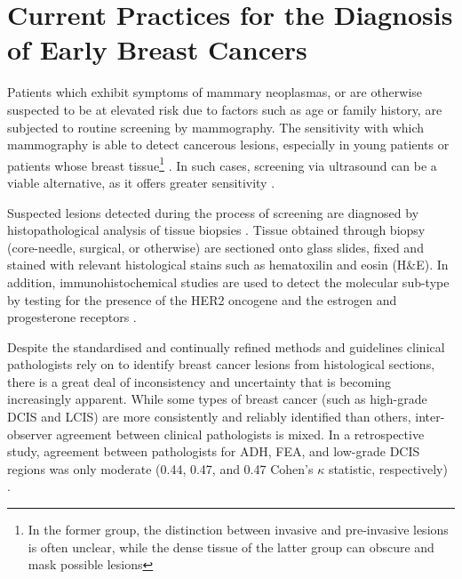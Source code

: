 
\section{Current Practices for the Diagnosis of Early Breast Cancers}
Patients which exhibit symptoms of mammary neoplasmas, or are otherwise suspected to be at elevated risk due to factors such as age or family history, are subjected to routine screening by mammography. The sensitivity with which mammography is able to detect cancerous lesions, especially in young patients or patients whose breast tissue\footnote{In the former group, the distinction between invasive and pre-invasive lesions is often unclear, while the dense tissue of the latter group can obscure and mask possible lesions} \citep{ayvaci2014}. In such cases, screening via ultrasound can be a viable alternative, as it offers greater sensitivity \citep{nothacker2009}.

Suspected lesions detected during the process of screening are diagnosed by histopathological analysis of tissue biopsies \citep{nccn}. Tissue obtained through biopsy (core-needle, surgical, or otherwise) are sectioned onto glass slides, fixed and stained with relevant histological stains such as hematoxilin and eosin (H\&E). In addition, immunohistochemical studies are used to detect the molecular sub-type by testing for the presence of the HER2 oncogene and the estrogen and progesterone receptors \citep{who_intro}.\par


Despite the standardised and continually refined methods and guidelines clinical pathologists rely on to identify breast cancer lesions from histological sections, there is a great deal of inconsistency and uncertainty that is becoming increasingly apparent. While some types of breast cancer (such as high-grade DCIS and LCIS) are more consistently and reliably identified than others, inter-observer agreement between clinical pathologists is mixed. In a retrospective study, agreement between pathologists for ADH, FEA, and low-grade DCIS regions was only moderate (0.44, 0.47, and 0.47 Cohen's $\kappa$ statistic, respectively) \citep{gomes2014}.\par
